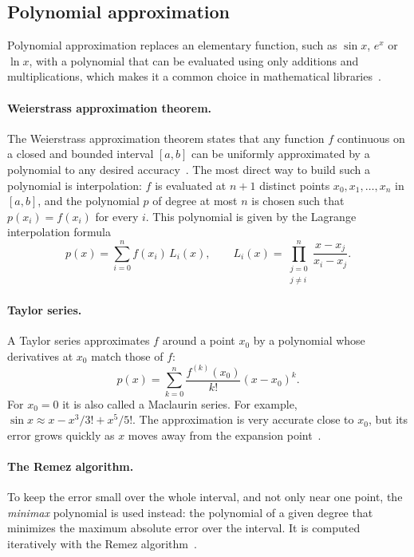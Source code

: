 \subsection{Polynomial approximation}
Polynomial approximation replaces an elementary function, such as $\sin x$, $e^{x}$ or $\ln x$, with a polynomial that can be evaluated using only additions and multiplications, which makes it a common choice in mathematical libraries~\cite{becker2022dandelion}.
\paragraph{Weierstrass approximation theorem.}
The Weierstrass approximation theorem states that any function $f$ continuous on a closed and bounded interval $[a, b]$ can be uniformly approximated by a polynomial to any desired accuracy~\cite{1708417}.
The most direct way to build such a polynomial is interpolation: $f$ is evaluated at $n+1$ distinct points $x_{0}, x_{1}, \dots, x_{n}$ in $[a, b]$, and the polynomial $p$ of degree at most $n$ is chosen such that $p(x_{i}) = f(x_{i})$ for every $i$.
This polynomial is given by the Lagrange interpolation formula~\cite{1708417}
\begin{equation}
  p(x) = \sum_{i=0}^{n} f(x_{i})\, L_{i}(x),
  \qquad
  L_{i}(x) = \prod_{\substack{j=0 \\ j \neq i}}^{n} \frac{x - x_{j}}{x_{i} - x_{j}}.
  \label{eq:lagrange}
\end{equation}

\paragraph{Taylor series.}
A Taylor series approximates $f$ around a point $x_{0}$ by a polynomial whose derivatives at $x_{0}$ match those of $f$:
\begin{equation}
  p(x) = \sum_{k=0}^{n} \frac{f^{(k)}(x_{0})}{k!} (x - x_{0})^{k}.
  \label{eq:taylor}
\end{equation}
For $x_{0} = 0$ it is also called a Maclaurin series.
For example, $\sin x \approx x - x^{3}/3! + x^{5}/5!$.
The approximation is very accurate close to $x_{0}$, but its error grows quickly as $x$ moves away from the expansion point~\cite{1708417}.

\paragraph{The Remez algorithm.}
To keep the error small over the whole interval, and not only near one point, the \emph{minimax} polynomial is used instead: the polynomial of a given degree that minimizes the maximum absolute error over the interval. It is computed iteratively with the Remez algorithm~\cite{muller2020}.

